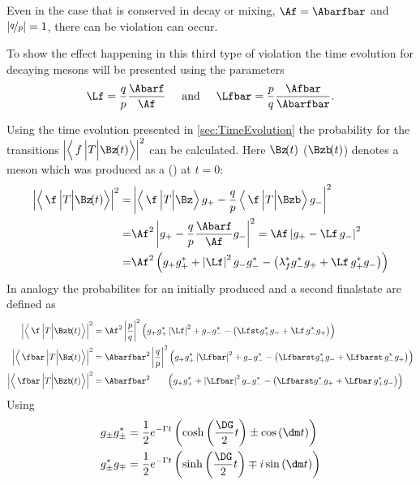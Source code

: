 Even in the case that \CP is conserved in decay or mixing, \ie $\Af=\Abarfbar$ and $\left|\nicefrac{q}{p}\right|=1$, there can be \CP violation can occur.

To show the effect happening in this third type of \CP violation the time evolution for decaying \B mesons will be presented using the parameters
\begin{equation}
\Lf=\frac{q}{p}\frac{\Abarf}{\Af}\hspace{0.5cm}\text{and}
\hspace{0.5cm}\Lfbar=\frac{p}{q}\frac{\Afbar}{\Abarfbar}.
\end{equation}






Using the time evolution presented in \cref{sec:TimeEvolution} the probability for the transitions $\left|\left<\,f\,\Big|T\Big|\Bz\!(t)\right>\right|^2$ can be calculated.
Here $\Bz\!(t)$ ($\Bzb\!(t)$) denotes a \B meson which was produced as a \Bz (\Bzb) at $t=0$:
\begin{align}
\left|\left<\,\f\,\Big|T\Big|\Bz\!(t)\right>\right|^2 =&
\left|\left<\,\f\,\Big|T\Big|\Bz\right>g_+-\frac{q}{p}\left<\,\f\,\Big|T\Big|\Bzb\right>g_-\right|^2\nonumber\\
=&\Af^2\left|g_+ - \frac{q}{p}\frac{\Abarf}{\Af} g_-\right|^2=\Af\left|g_+ -\Lf\,g_-\right|^2\nonumber\\
=&\Af^2\left(g_+g_+^*+\left|\Lf\right|^2g_-g_-^*-\left(\lambda_{f}^*g_-^*g_+ + \Lf\,g_+^* g_-\right)\right)
\end{align}
In analogy the probabilites for an initially produced \Bzb and a second finalstate \fbar are defined as
\begin{align}
\left|\left<\,\f\,\Big|T\Big|\Bzb\!(t)\right>\right|^2 &=
\Af^2\left|\frac{p}{q}\right|^2\left(g_+g_+^*\left|\Lf\right|^2+g_-g_-^*-\left(\Lfst g_+^*g_- + \Lf\,g_-^* g_+\right)\right)\\
\left|\left<\,\fbar\,\Big|T\Big|\Bz\!(t)\right>\right|^2 &=
\Abarfbar^2\left|\frac{q}{p}\right|^2\left(g_+g_+^*\left|\Lfbar\right|^2+g_-g_-^*-\left(\Lfbarst g_+^*g_- + \Lfbarst\,g_-^* g_+\right)\right)\\
\left|\left<\,\fbar\,\Big|T\Big|\Bzb\!(t)\right>\right|^2 &=
\Abarfbar^2\hphantom{\left|\frac{q}{p}\right|^2}\left(g_+g_+^*+\left|\Lfbar\right|^2g_-g_-^*-\left(\Lfbarst g_-^*g_+ + \Lfbar\,g_+^* g_-\right)\right)
\end{align}
Using
\begin{align}
g_{\pm}g_{\pm}^{*} &= \frac{1}{2}e^{-\Gamma t}\left(\cosh\left(\frac{\DG}{2}t\right)\pm\cos\left(\dm t\right)\right)\\
g_{\pm}^*g_{\mp} &=  \frac{1}{2}e^{-\Gamma t}\left(\sinh\left(\frac{\DG}{2}t\right)\mp i\sin\left(\dm t\right)\right)
\end{align}
